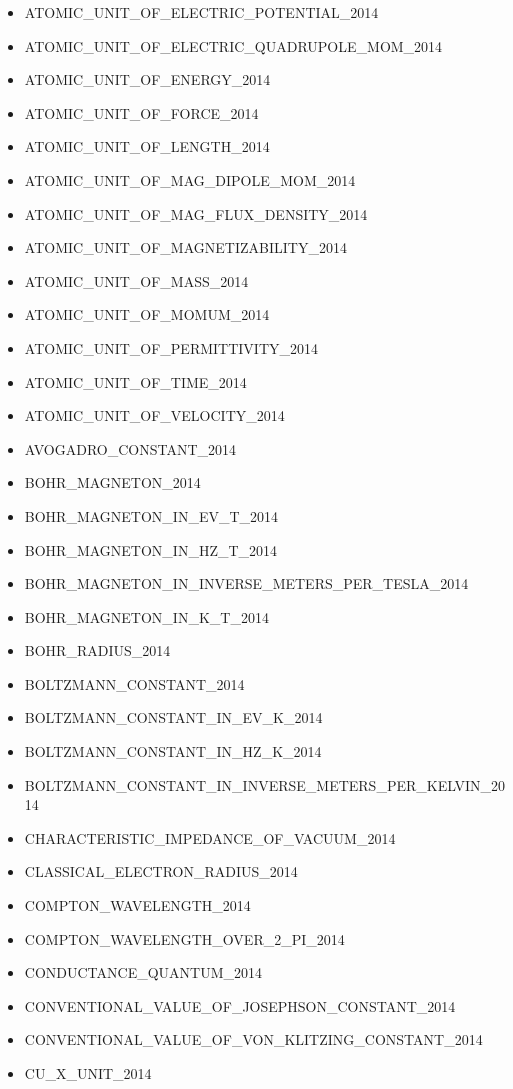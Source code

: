 \begin{itemize}
\item ATOMIC\_UNIT\_OF\_ELECTRIC\_POTENTIAL\_2014
\item ATOMIC\_UNIT\_OF\_ELECTRIC\_QUADRUPOLE\_MOM\_2014
\item ATOMIC\_UNIT\_OF\_ENERGY\_2014
\item ATOMIC\_UNIT\_OF\_FORCE\_2014
\item ATOMIC\_UNIT\_OF\_LENGTH\_2014
\item ATOMIC\_UNIT\_OF\_MAG\_DIPOLE\_MOM\_2014
\item ATOMIC\_UNIT\_OF\_MAG\_FLUX\_DENSITY\_2014
\item ATOMIC\_UNIT\_OF\_MAGNETIZABILITY\_2014
\item ATOMIC\_UNIT\_OF\_MASS\_2014
\item ATOMIC\_UNIT\_OF\_MOMUM\_2014
\item ATOMIC\_UNIT\_OF\_PERMITTIVITY\_2014
\item ATOMIC\_UNIT\_OF\_TIME\_2014
\item ATOMIC\_UNIT\_OF\_VELOCITY\_2014
\item AVOGADRO\_CONSTANT\_2014
\item BOHR\_MAGNETON\_2014
\item BOHR\_MAGNETON\_IN\_EV\_T\_2014
\item BOHR\_MAGNETON\_IN\_HZ\_T\_2014
\item BOHR\_MAGNETON\_IN\_INVERSE\_METERS\_PER\_TESLA\_2014
\item BOHR\_MAGNETON\_IN\_K\_T\_2014
\item BOHR\_RADIUS\_2014
\item BOLTZMANN\_CONSTANT\_2014
\item BOLTZMANN\_CONSTANT\_IN\_EV\_K\_2014
\item BOLTZMANN\_CONSTANT\_IN\_HZ\_K\_2014
\item BOLTZMANN\_CONSTANT\_IN\_INVERSE\_METERS\_PER\_KELVIN\_2014
\item CHARACTERISTIC\_IMPEDANCE\_OF\_VACUUM\_2014
\item CLASSICAL\_ELECTRON\_RADIUS\_2014
\item COMPTON\_WAVELENGTH\_2014
\item COMPTON\_WAVELENGTH\_OVER\_2\_PI\_2014
\item CONDUCTANCE\_QUANTUM\_2014
\item CONVENTIONAL\_VALUE\_OF\_JOSEPHSON\_CONSTANT\_2014
\item CONVENTIONAL\_VALUE\_OF\_VON\_KLITZING\_CONSTANT\_2014
\item CU\_X\_UNIT\_2014

\end{itemize}

